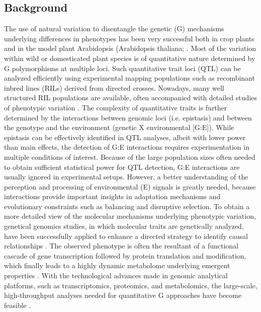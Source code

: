 \subsection{Background}
The use of natural variation to disentangle the genetic (G) mechanisms underlying differences in phenotypes 
has been very successful both in crop plants and in the model plant Arabidopsis (Arabidopsis thaliana; 
\cite{Alonso-Blanco:2009}. Most of the variation within wild or domesticated plant species is of 
quantitative nature determined by G polymorphisms at multiple loci. Such quantitative trait loci (QTL) 
can be analyzed efficiently using experimental mapping populations such as recombinant inbred lines (RILs)
derived from directed crosses. Nowadays, many well structured RIL populations are available, often 
accompanied with detailed studies of phenotypic variation \cite{Mitchell-Olds:2006}. The complexity 
of quantitative traits is further determined by the interactions between genomic loci (i.e. epistasis) and 
between the genotype and the environment (genetic X environmental [G:E]). While epistasis can be effectively
identified in QTL analyses, albeit with lower power than main effects, the detection of G:E interactions 
requires experimentation in multiple conditions of interest. Because of the large population sizes often 
needed to obtain sufficient statistical power for QTL detection, G:E interactions are usually ignored in 
experimental setups. However, a better understanding of the perception and processing of environmental (E)
signals is greatly needed, because interactions provide important insights in adaptation mechanisms and
evolutionary constraints such as balancing and disruptive selection. To obtain a more detailed view of the
molecular mechanisms underlying phenotypic variation, genetical genomics studies, in which molecular traits
are genetically analyzed, have been successfully applied to enhance a directed strategy to identify causal
relationships \cite{West:2007, Keurentjes:2007, Kliebenstein:2006, Rowe:2008}. The observed phenotype is often the resultant 
of a functional cascade of gene transcription followed by protein translation and modification, which 
finally leads to a highly dynamic metabolome underlying emergent properties \cite{Kooke:2012}. 
With the technological advances made in genomic analytical platforms, such as transcriptomics, proteomics, 
and metabolomics, the large-scale, high-throughput analyses needed for quantitative G approaches have 
become feasible \cite{Jansen:2001a}. 

